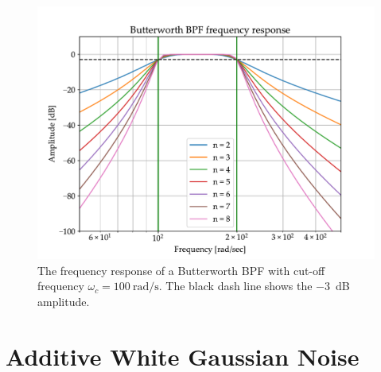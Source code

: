 \documentclass[../ECE459FinalProjectReport.tex]{subfiles}
\begin{document}
\begin{figure}[b]
    \centering
    \includegraphics[scale=0.7]{plots/butterworth-bpf.pdf}
    \caption{The frequency response of a Butterworth BPF with cut-off frequency $\omega_c = \SI{100}{\radian\per\s}$. The black dash line shows the \SI{-3}{\dB} amplitude.}
    \label{fig:butter-bpf}
\end{figure}


\section{Additive White Gaussian Noise}
\end{document}
